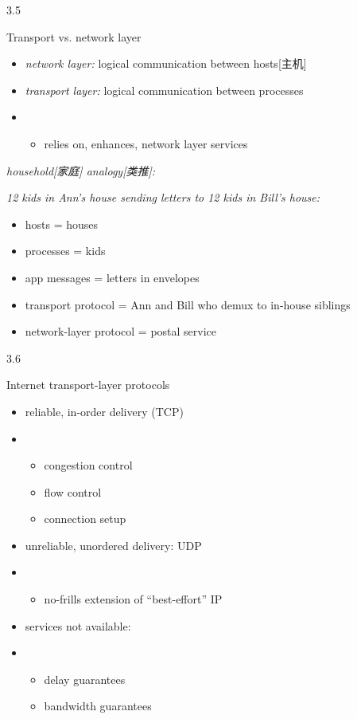 \documentclass[
]{article}
\begin{document}
3.5

Transport vs. network layer

\begin{itemize}
\item
  \emph{network layer:} logical communication between hosts{[}主机{]}
\item
  \emph{transport layer:} logical communication between processes
\item
  \begin{itemize}
  \item
    relies on, enhances, network layer services
  \end{itemize}
\end{itemize}

\emph{household{[}家庭{]} analogy{[}类推{]}:}

\emph{12 kids in Ann's house sending letters to 12 kids in Bill's
house:}

\begin{itemize}
\item
  hosts = houses
\item
  processes = kids
\item
  app messages = letters in envelopes
\item
  transport protocol = Ann and Bill who demux to in-house siblings
\item
  network-layer protocol = postal service
\end{itemize}

3.6

Internet transport-layer protocols

\begin{itemize}
\item
  reliable, in-order delivery (TCP)
\item
  \begin{itemize}
  \item
    congestion control
  \item
    flow control
  \item
    connection setup
  \end{itemize}
\item
  unreliable, unordered delivery: UDP
\item
  \begin{itemize}
  \item
    no-frills extension of ``best-effort'' IP
  \end{itemize}
\item
  services not available:
\item
  \begin{itemize}
  \item
    delay guarantees
  \item
    bandwidth guarantees
  \end{itemize}
\end{itemize}
\end{document}
